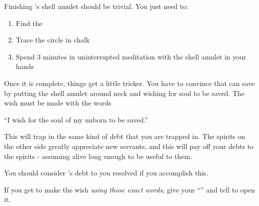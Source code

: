 \documentclass[green]{NeptuneBall}
\begin{document}
\name{\gAmulet{}}

Finishing \cAriel{}'s shell amulet should be trivial. You just need to:
\begin{enumerate}
\item Find the \sRunicCircle{}
\item Trace the circle in chalk
\item Spend 3 minutes in uninterrupted meditation with the shell amulet in your hands
\end{enumerate}

Once it is complete, things get a little tricker. You have to convince \cAriel{} that \cAriel{\they} can save \cAriel{\their}  by putting the shell amulet around \cAriel{\their} neck and wishing for  soul to be saved. The wish must be made with the words

``I wish for the soul of my unborn  to be saved.''

This will trap \cAriel{} in the same kind of debt that you are trapped in. The spirits on the other side greatly appreciate new servants, and this will pay off your debts to the spirits - assuming \cAriel{\they}  alive long enough to be useful to them.

You should consider \cAriel{}'s debt to you resolved if you accomplish this.

If you get \cAriel{} to make the wish \emph{using those exact words}, give \cAriel{\them} your ``\mMEnvelope{\MYname}'' and tell \cAriel{\them} to open it.
\end{document}
